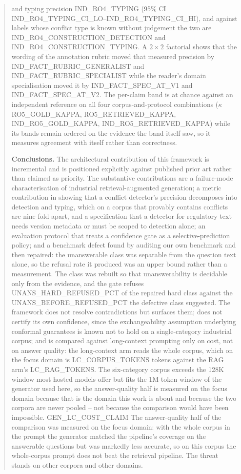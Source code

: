 \documentclass[preprint,3p,times]{elsarticle}
\begin{document}
\begin{abstract}
and typing precision {{IND_RO4_TYPING}} (95\% CI {{IND_RO4_TYPING_CI_LO}}--{{IND_RO4_TYPING_CI_HI}}),
and against labels whose conflict type is known without judgement the two are
{{IND_RO4_CONSTRUCTION_DETECTION}} and {{IND_RO4_CONSTRUCTION_TYPING}}. A
$2\times2$ factorial shows that the wording of the annotation rubric moved
that measured precision by {{IND_FACT_RUBRIC_GENERALIST}} and
{{IND_FACT_RUBRIC_SPECIALIST}} while the reader's domain specialisation moved
it by {{IND_FACT_SPEC_AT_V1}} and {{IND_FACT_SPEC_AT_V2}}. The per-claim band
is at chance against an independent reference on all four
corpus-and-protocol combinations ($\kappa$ {{RO5_GOLD_KAPPA}},
{{RO5_RETRIEVED_KAPPA}}, {{IND_RO5_GOLD_KAPPA}}, {{IND_RO5_RETRIEVED_KAPPA}})
while its bands remain ordered on the evidence the band itself saw, so it
measures agreement with itself rather than correctness.

\textbf{Conclusions.} The architectural contribution of this framework is
incremental and is positioned explicitly against published prior art rather
than claimed as priority. The substantive contributions are a failure-mode
characterisation of industrial retrieval-augmented generation; a metric
contribution in showing that a conflict detector's precision decomposes into
detection and typing, which on a corpus that provably contains conflicts are
nine-fold apart, and a specification that a detector for regulatory text needs
version metadata or must be scoped to detection alone; an evaluation
protocol that treats a confidence gate as a selective-prediction policy; and
a benchmark defect found by auditing our own benchmark and then repaired: the
unanswerable class was separable from the question text alone, so the refusal
rate it produced was an upper bound rather than a measurement. The class was
rebuilt so that unanswerability is decidable only from the evidence, and the
gate refuses {{UNANS_HARD_REFUSED_PCT}} of the repaired hard class against the
{{UNANS_BEFORE_REFUSED_PCT}} the defective class suggested. The
framework does not resolve contradictions but surfaces them; does not certify
its own confidence, since the exchangeability assumption underlying conformal
guarantees is known not to hold on a single-category industrial corpus; and is
compared against long-context prompting only on cost, not on answer quality:
the long-context arm reads the whole corpus, which on the focus domain is
{{LC_CORPUS_TOKENS}} tokens against the RAG arm's {{LC_RAG_TOKENS}}. The
six-category corpus exceeds the 128K window most hosted models offer but fits
the 1M-token window of the generator used here, so the answer-quality half is
measured on the focus domain because that is the domain this work is about and
because the two corpora are never pooled -- not because the comparison would
have been impossible.
{{GEN_LC_COST_CLAIM}} The answer-quality half of the
comparison was measured on the focus domain: with the whole corpus in the
prompt the generator matched the pipeline's coverage on the answerable
questions but was markedly less accurate, so on this corpus the whole-corpus
prompt does not beat the retrieval pipeline. The threat stands on other
corpora and other domains.
\end{abstract}
\end{document}
